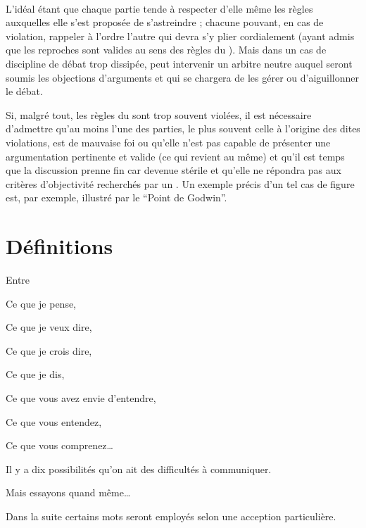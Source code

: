 \paragraph{}
L’idéal étant que chaque partie tende à respecter d’elle même les règles auxquelles elle s’est proposée de s’astreindre ; chacune pouvant, en cas de violation, rappeler à l’ordre l’autre qui devra s’y plier cordialement (ayant admis que les reproches sont valides au sens des règles du \mainabbr{}). Mais dans un cas de discipline de débat trop dissipée, peut intervenir un arbitre neutre auquel seront soumis les objections d’arguments et qui se chargera de les gérer ou d’aiguillonner le débat.

Si, malgré tout, les règles du \mainabbr{} sont trop souvent violées, il est nécessaire d’admettre qu’au moins l’une des parties, le plus souvent celle à l’origine des dites violations, est de mauvaise foi ou qu’elle n’est pas capable de présenter une argumentation pertinente et valide (ce qui revient au même) et qu’il est temps que la discussion prenne fin car devenue stérile et qu’elle ne répondra pas aux critères d’objectivité recherchés par un \mainabbr{}. Un exemple précis d’un tel cas de figure est, par exemple, illustré par le \enquote{Point de Godwin}.


\section{Définitions}
\epigraph{Entre

Ce que je pense,

Ce que je veux dire,

Ce que je crois dire,

Ce que je dis,

Ce que vous avez envie d’entendre,

Ce que vous entendez,

Ce que vous comprenez…

Il y a dix possibilités qu’on ait des difficultés à communiquer.

Mais essayons quand même…
}{}
Dans la suite certains mots seront employés selon une acception particulière.


